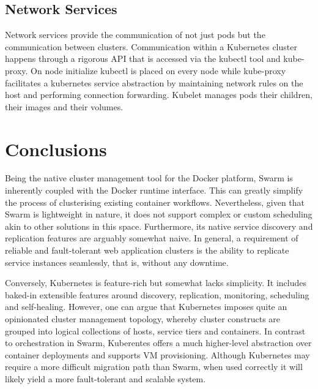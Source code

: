 \documentclass{article}
\begin{document}
\subsection{Network Services}
Network services provide the communication of not just pods but the communication between clusters. Communication within a Kubernetes cluster happens through a rigorous API that is accessed via the kubectl tool and kube-proxy. On node initialize kubectl is placed on every node while kube-proxy facilitates a kubernetes service abstraction by maintaining network rules on the host and performing connection forwarding. Kubelet manages pods their children, their images and their volumes.

\section{Conclusions}
Being the native cluster management tool for the Docker platform, Swarm is inherently coupled with the Docker runtime interface. This can greatly simplify the process of clusterising existing container workflows. Nevertheless, given that Swarm is lightweight in nature, it does not support complex or custom scheduling akin to other solutions in this space. Furthermore, its native service discovery and replication features are arguably somewhat naive. In general, a requirement of reliable and fault-tolerant web application clusters is the ability to replicate service instances seamlessly, that is, without any downtime.
\par
Conversely, Kubernetes is feature-rich but somewhat lacks simplicity. It includes baked-in extensible features around discovery, replication, monitoring, scheduling and self-healing. However, one can argue that Kubernetes imposes quite an opinionated cluster management topology, whereby cluster constructs are grouped into logical collections of hosts, service tiers and containers. In contrast to orchestration in Swarm, Kuberentes offers a much higher-level abstraction over container deployments and supports VM provisioning. Although Kubernetes may require a more difficult migration path than Swarm, when used correctly it will likely yield a more fault-tolerant and scalable system.

\vspace{-7.5mm}
\renewcommand{\refname}{\section{References}}

\end{document}
